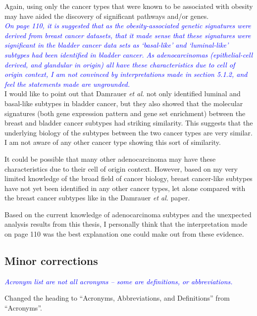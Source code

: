 \documentclass[a4paper, 12pt]{article}
\begin{document}
Again, using only the cancer types that were known to be associated with obesity may have aided the discovery of significant pathways and/or genes.
\\

\noindent
\textcolor{blue}{
\textit{On page 110, it is suggested that as the obesity-associated genetic signatures were derived from breast cancer datasets, that it made sense that these signatures were significant in the bladder cancer data sets as `basal-like' and `luminal-like' subtypes had been identified in bladder cancer.
As adenocarcinomas (epithelial-cell derived, and glandular in origin) all have these characteristics due to cell of origin context, I am not convinced by interpretations made in section 5.1.2, and feel the statements made are ungrounded.
}
}\\

\noindent
I would like to point out that Damrauer \textit{et al.} not only identified luminal and basal-like subtypes in bladder cancer, but they also showed that the molecular signatures (both gene expression pattern and gene set enrichment) between the breast and bladder cancer subtypes had striking similarity.
This suggests that the underlying biology of the subtypes between the two cancer types are very similar.
I am not aware of any other cancer type showing this sort of similarity.

It could be possible that many other adenocarcinoma may have these characteristics due to their cell of origin context.
However, based  on my very limited knowledge of the broad field of cancer biology, breast cancer-like subtypes  have not yet been identified in any other cancer types, let alone compared with the breast cancer subtypes like in the Damrauer \textit{et al.} paper.

Based on the current knowledge of adenocarcinoma subtypes and the unexpected analysis results from this thesis, I personally think that the interpretation made on page 110  was the best explanation one could make out from these evidence.
\\

\subsection*{Minor corrections}
\label{sub:minor_corrections}

\noindent
\textcolor{blue}{
\textit{Acronym list are not all acronyms -- some are definitions, or abbreviations.
}
}

\noindent
Changed the heading to ``Acronyms, Abbreviations, and Definitions'' from ``Acronyms''.
\\
\end{document}
